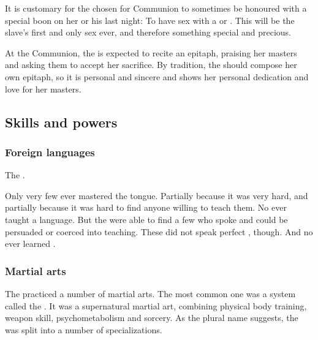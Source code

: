 It is customary for the \naor{} chosen for Communion to sometimes be honoured with a special boon on her or his last night: 
To have sex with a \resphan{} or \resvil. 
This will be the slave's first and only sex ever, and therefore something special and precious.  

At the Communion, the \naor{} is expected to recite an epitaph, praising her masters and asking them to accept her sacrifice. 
By tradition, the \naor{} should compose her own epitaph, so it is personal and sincere and shows her personal dedication and love for her masters. 









\subsection{Skills and powers}





\subsubsection{Foreign languages}
The \resphain {}. 

Only very few \resphain ever mastered the \Draconic tongue. 
Partially because it was very hard, and partially because it was hard to find anyone willing to teach them. 
No \dragon ever taught a \resphan language. 
But the \resphain were able to find a few \quiljaaran who spoke \Draconic and could be persuaded or coerced into teaching. 
These \quiljaaran did not speak perfect \Draconic, though. 
And no \resphan ever learned \TrueDraconic. 






\subsubsection{Martial arts}
The \resphain{} practiced a number of martial arts. 
The most common one was a system called the . 
It was a supernatural martial art, combining physical body training, weapon skill, psychometabolism and sorcery. 
As the plural name suggests, the  was split into a number of specializations.


